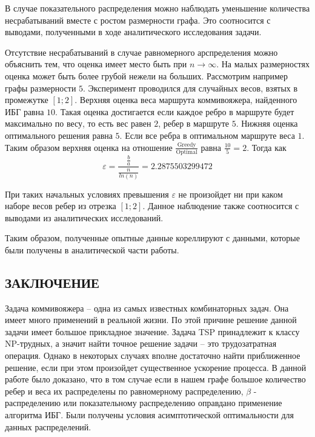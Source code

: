 \documentclass[a4paper, 14pt]{extarticle}
\numberwithin{equation}{section}
\begin{document}
В случае показательного распределения можно наблюдать уменьшение количества несрабатываний вместе с ростом размерности графа. Это соотносится с выводами, полученными в ходе аналитического исследования задачи. 

Отсутствие несрабатываний в случае равномерного арспределения можно объяснить тем, что оценка имеет место быть при $n \rightarrow \infty$. На малых размерностях оценка может быть более грубой нежели на больших. Рассмотрим например графы размерности $5$. Эксперимент проводился для случайных весов, взятых в промежутке $[1;2]$. Верхняя оценка веса маршрута коммивояжера, найденного ИБГ равна $10$. Такая оценка достигается если каждое ребро в маршруте будет максимально по весу, то есть вес равен $2$, ребер в маршруте $5$. Нижняя оценка оптимального решения равна $5$. Если все ребра в оптимальном маршруте веса $1$. Таким образом верхняя оценка на отношение $\frac{\mathrm{Greedy}}{\mathrm{Optimal}}$ равна $\frac{10}{5} = 2$. Тогда как
\begin{equation}
\varepsilon = \frac{\frac{b}{a}}{\frac{n}{ln(n)}} = 2.2875503299472
\end{equation}

При таких начальных условиях превышения $\varepsilon$ не произойдет ни при каком наборе весов ребер из отрезка $[1;2]$. Данное наблюдение также соотносится с выводами из аналитических исследований.

Таким образом, полученные опытные данные кореллируют с данными, которые были получены в аналитической части работы.

\newpage

\begin{center}
\chapter{\textbf{ЗАКЛЮЧЕНИЕ}}
\end{center}

Задача коммивояжера -- одна из самых известных комбинаторных задач. 
Она имеет много применений в реальной жизни. По этой причине решение данной задачи имеет большое прикладное значение. Задача TSP принадлежит к классу NP-трудных, а значит найти точное решение задачи -- это трудозатратная операция. Однако в некоторых случаях вполне достаточно найти приближенное решение, если при этом произойдет существенное ускорение процесса. В данной работе было доказано, что в том случае если в нашем графе большое количество ребер и веса их распределены по равномерному распределению, $\beta$ - распределению или показательному распределению оправдано применение алгоритма ИБГ. Были получены условия асимптотической оптимальности для данных распределений.
\end{document}
